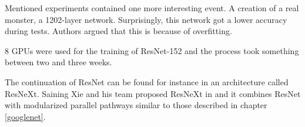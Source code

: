 Mentioned experiments contained one more interesting event. A creation of a real 
monster, a 1202-layer network. Surprisingly, this network got a lower accuracy 
during tests. Authors argued that this is because of overfitting.

8 GPUs were used for the training of ResNet-152 and the process took something 
between two and three weeks.

The continuation of ResNet can be found for instance in an architecture called 
ResNeXt. Saining Xie and his team proposed ResNeXt in \cite{resnext} and it 
combines ResNet with modularized parallel pathways similar to those described in 
chapter \ref{googlenet}.



